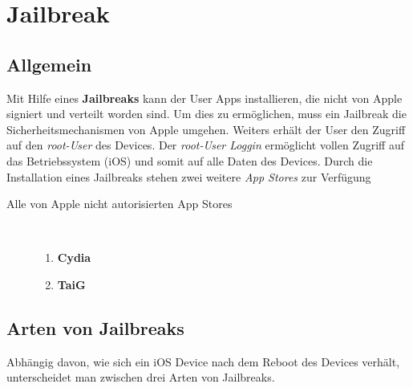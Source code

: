 %
%
% 
%
% 


\chapter{Jailbreak}
\label{ch:JB}

\section{Allgemein}
\label{sec:JBAllgemein}

Mit Hilfe eines \textbf{Jailbreaks} kann der User Apps installieren, die nicht von Apple signiert und verteilt worden sind. Um dies zu ermöglichen, muss ein Jailbreak die Sicherheitsmechanismen von Apple umgehen. Weiters erhält der User den Zugriff auf den \textit{\glqq root-User\grqq{}} des Devices. Der \textit{\glqq root-User Loggin\grqq{}} ermöglicht vollen Zugriff auf das Betriebssystem (iOS) und somit auf alle Daten des Devices. Durch die Installation eines Jailbreaks stehen zwei weitere \textit{\glqq App Stores\grqq{}} zur Verfügung

\begin{description}
\item[Alle von Apple nicht autorisierten App Stores]~
	\begin{enumerate}
	   	\item \textbf{Cydia} \cite{Cydia[1]}
		\item \textbf{TaiG}
	\end{enumerate}
\end{description}

\section{Arten von Jailbreaks}
\label{sec:JBArten}
Abhängig davon, wie sich ein iOS Device nach dem Reboot des Devices verhält, unterscheidet man zwischen drei Arten von Jailbreaks. 

